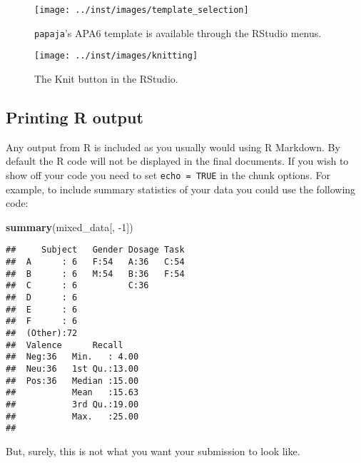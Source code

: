\documentclass[english,man,floatsintext]{apa6}
\newenvironment{Shaded}{\begin{snugshade}}{\end{snugshade}}
\newcommand{\DecValTok}[1]{\textcolor[rgb]{0.00,0.00,0.81}{#1}}
\newcommand{\KeywordTok}[1]{\textcolor[rgb]{0.13,0.29,0.53}{\textbf{#1}}}
\newcommand{\NormalTok}[1]{#1}
\begin{document}
\begin{figure}

{\centering \texttt{[image: ../inst/images/template\_selection]} 

}

\caption{\texttt{papaja}'s APA6 template is available through the RStudio menus.}\label{fig:menu}
\end{figure}



\begin{figure}

{\centering \texttt{[image: ../inst/images/knitting]} 

}

\caption{The Knit button in the RStudio.}\label{fig:knit}
\end{figure}

\hypertarget{printing-r-output}{%
\subsection{Printing R output}\label{printing-r-output}}

Any output from R is included as you usually would using R Markdown.
By default the R code will not be displayed in the final documents.
If you wish to show off your code you need to set \texttt{echo\ =\ TRUE} in the chunk options.
For example, to include summary statistics of your data you could use the following code:

\begin{Shaded}
\begin{Highlighting}[]
\KeywordTok{summary}\NormalTok{(mixed_data[, }\DecValTok{-1}\NormalTok{])}
\end{Highlighting}
\end{Shaded}

\begin{verbatim}
##     Subject   Gender Dosage Task  
##  A      : 6   F:54   A:36   C:54  
##  B      : 6   M:54   B:36   F:54  
##  C      : 6          C:36         
##  D      : 6                       
##  E      : 6                       
##  F      : 6                       
##  (Other):72                       
##  Valence      Recall     
##  Neg:36   Min.   : 4.00  
##  Neu:36   1st Qu.:13.00  
##  Pos:36   Median :15.00  
##           Mean   :15.63  
##           3rd Qu.:19.00  
##           Max.   :25.00  
## 
\end{verbatim}

But, surely, this is not what you want your submission to look like.
\end{document}
